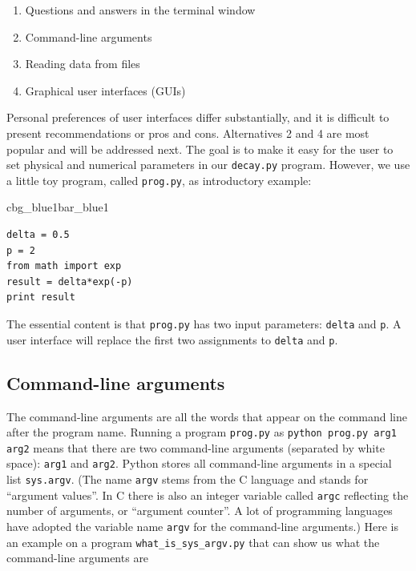 \documentclass[%
oneside,                 %
final,                   %
10pt]{article}
\newenvironment{_pro_tight}[2]{
   \def\FrameCommand{\color{#2}\vrule width 1mm\normalcolor\colorbox{#1}}
   \FrameRule0.6pt\MakeFramed {\advance\hsize-2mm\FrameRestore}\vskip3mm}
   {\vskip0mm\endMakeFramed}
\newenvironment{pro}[2]{
\bgroup\rmfamily
\fboxsep=0mm\relax
\begin{_pro_tight}{#1}{#2}
\list{}{\parsep=-2mm\parskip=0mm\topsep=0pt\leftmargin=2mm
\rightmargin=2\leftmargin\leftmargin=4pt\relax}
\item\relax}
{\endlist\end{_pro_tight}\egroup}
\begin{document}
\begin{enumerate}
\item Questions and answers in the terminal window

\item Command-line arguments

\item Reading data from files

\item Graphical user interfaces (GUIs)
\end{enumerate}

\noindent
Personal preferences of user interfaces differ substantially, and it is
difficult to present recommendations or pros and cons.
Alternatives 2 and 4 are most popular and will be addressed next.
The goal is to make it easy for the user to
set physical and numerical parameters in
our \texttt{decay.py} program. However, we use  a little toy program, called
\texttt{prog.py}, as introductory
example:

\begin{pro}{cbg_blue1}{bar_blue1}\begin{Verbatim}[numbers=none,fontsize=\fontsize{9pt}{9pt},baselinestretch=0.95,xleftmargin=2mm]
delta = 0.5
p = 2
from math import exp
result = delta*exp(-p)
print result
\end{Verbatim}
\end{pro}
\noindent
The essential content is that \texttt{prog.py} has two input parameters: \texttt{delta}
and \texttt{p}. A user interface will replace the first two assignments to
\texttt{delta} and \texttt{p}.

\subsection{Command-line arguments}

The command-line arguments are all the words that appear on the
command line after the program name. Running a program \texttt{prog.py}
as \texttt{python prog.py arg1 arg2} means that there are two command-line arguments
(separated by white space): \texttt{arg1} and \texttt{arg2}.
Python stores all command-line arguments in
a special list \texttt{sys.argv}. (The name \texttt{argv} stems from the C language and
stands for ``argument values''. In C there is also an integer variable
called \texttt{argc} reflecting the number of arguments, or ``argument counter''.
A lot of programming languages have adopted the variable name \texttt{argv} for
the command-line arguments.)
Here is an example on a
program \Verb!what_is_sys_argv.py! that can show us what the command-line arguments
are
\end{document}
